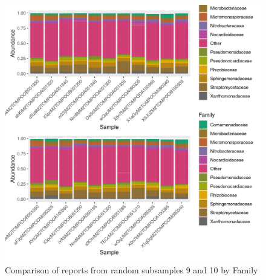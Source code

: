 \documentclass{article}
\begin{document}
\begin{figure}
\centering
\includegraphics[scale=0.8]{tomate_aleatorio1_9.csv_tomate_aleatorio1_10.csv_relative_abundance_Family.png}
\caption{Comparison of reports from random subsamples 9 and 10 by Family}
\end{figure}
\end{document}

